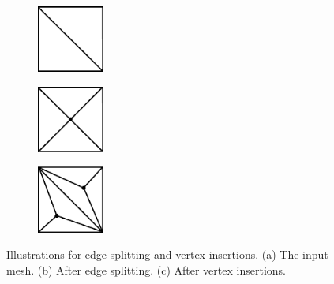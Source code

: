 \documentclass[11pt, oneside, a4paper]{memoir}
\begin{document}
\begin{figure}[p]
\centering
\begin{subfigure}[c]{0.3\linewidth}
\centering
\includegraphics[height=2.2cm]{images/cutting-mig2015/basic_mesh.pdf}
\caption{\label{fig:basicMesh}}
\end{subfigure}
\hfill
\begin{subfigure}[c]{0.3\linewidth}
\centering
\includegraphics[height=2.2cm]{images/cutting-mig2015/edge_split.pdf}
\caption{\label{fig:edgeSplitting}}
\end{subfigure}
\hfill
\begin{subfigure}[c]{0.3\linewidth}
\centering
\includegraphics[height=2.2cm]{images/cutting-mig2015/vertex_insertion.pdf}
\caption{\label{fig:vertexInsertion}}
\end{subfigure}
\caption{\label{fig:operations} Illustrations for edge splitting and vertex insertions. (a) The input mesh. (b) After edge splitting. (c) After vertex insertions.}
\end{figure}
\end{document}
